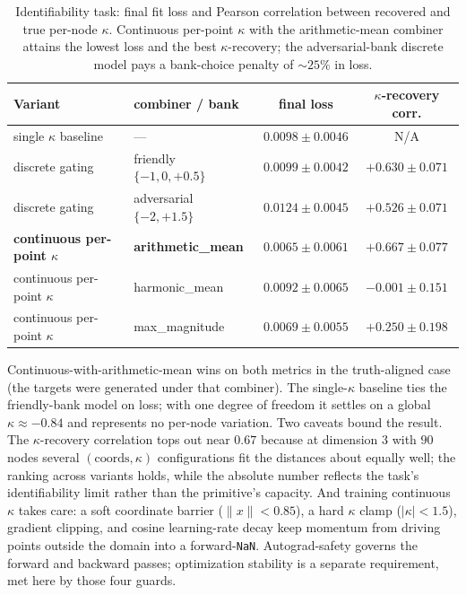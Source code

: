\documentclass{article}
\newcommand{\kp}{\kappa}
\newcommand{\code}[1]{\texttt{#1}}
\begin{document}
\begin{table}[t]
  \centering
  \caption{Identifiability task: final fit loss and Pearson correlation
  between recovered and true per-node $\kp$. Continuous per-point $\kp$
  with the arithmetic-mean combiner attains the lowest loss and the best
  $\kp$-recovery; the adversarial-bank discrete model pays a
  bank-choice penalty of $\sim\!25\%$ in loss.}
  \label{tab:hetero}
  \begin{tabular}{llcc}
    \toprule
    Variant & combiner / bank & final loss & $\kp$-recovery corr. \\
    \midrule
    single $\kp$ baseline & --- & $0.0098 \pm 0.0046$ & N/A \\
    discrete gating & friendly $\{-1,0,+0.5\}$ & $0.0099 \pm 0.0042$ & $+0.630 \pm 0.071$ \\
    discrete gating & adversarial $\{-2,+1.5\}$ & $0.0124 \pm 0.0045$ & $+0.526 \pm 0.071$ \\
    \textbf{continuous per-point $\kp$} & \textbf{arithmetic\_mean} & $\mathbf{0.0065 \pm 0.0061}$ & $\mathbf{+0.667 \pm 0.077}$ \\
    continuous per-point $\kp$ & harmonic\_mean & $0.0092 \pm 0.0065$ & $-0.001 \pm 0.151$ \\
    continuous per-point $\kp$ & max\_magnitude & $0.0069 \pm 0.0055$ & $+0.250 \pm 0.198$ \\
    \bottomrule
  \end{tabular}
\end{table}

Continuous-with-arithmetic-mean wins on both metrics in the
truth-aligned case (the targets were generated under that combiner). The
single-$\kp$ baseline ties the friendly-bank model on loss; with one
degree of freedom it settles on a global $\kp \approx -0.84$ and
represents no per-node variation. Two caveats bound the result. The
$\kp$-recovery correlation tops out near $0.67$ because at dimension $3$
with $90$ nodes several $(\text{coords},\kp)$ configurations fit the
distances about equally well; the ranking across variants holds, while
the absolute number reflects the task's identifiability limit rather
than the primitive's capacity. And training continuous $\kp$ takes care:
a soft coordinate barrier ($\lVert x\rVert < 0.85$), a hard $\kp$ clamp
($|\kp| < 1.5$), gradient clipping, and cosine learning-rate decay keep
momentum from driving points outside the domain into a forward-\code{NaN}.
Autograd-safety governs the forward and backward passes; optimization
stability is a separate requirement, met here by those four guards.
\end{document}
